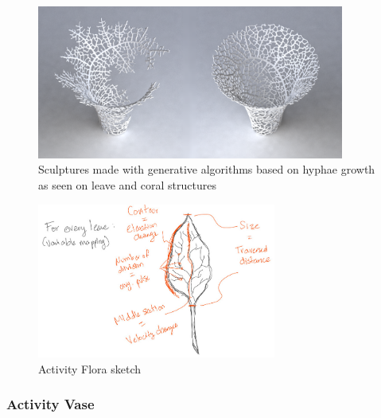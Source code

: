 \documentclass[../medieninformatik-arbeit.tex]{subfiles}
\begin{document}
\begin{figure}[h]
\captionsetup{width=0.9\textwidth}
\begin{center}
  \includegraphics[width=0.9\textwidth]{Prototype/img/nervous}
  \caption{Sculptures made with generative algorithms based on hyphae growth as seen on leave and coral structures\cite{nervous}}
\label{fig:nervous}
\end{center}
\end{figure}

\begin{figure}[h]
\captionsetup{width=0.9\textwidth}
\begin{center}
  \includegraphics[width=0.7\textwidth]{Prototype/img/ActivityFlora_detail}
  \caption{Activity Flora sketch}
\label{fig:activityflora}
\end{center}
\end{figure}


\subsubsection{Activity Vase}
\end{document}
